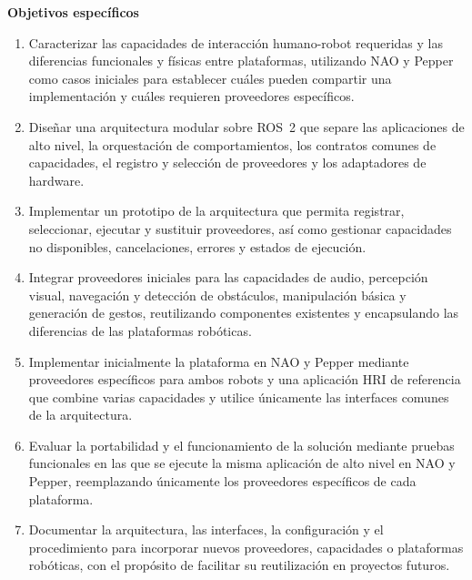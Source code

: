 \documentclass[11pt,letterpaper]{article}
\begin{document}
\par\medskip\noindent\textbf{Objetivos específicos}\par

\begin{enumerate}

\item Caracterizar las capacidades de interacción humano-robot requeridas y las diferencias funcionales y físicas entre plataformas, utilizando NAO y Pepper como casos iniciales para establecer cuáles pueden compartir una implementación y cuáles requieren proveedores específicos.

\item Diseñar una arquitectura modular sobre ROS~2 que separe las aplicaciones de alto nivel, la orquestación de comportamientos, los contratos comunes de capacidades, el registro y selección de proveedores y los adaptadores de hardware.

\item Implementar un prototipo de la arquitectura que permita registrar, seleccionar, ejecutar y sustituir proveedores, así como gestionar capacidades no disponibles, cancelaciones, errores y estados de ejecución.

\item Integrar proveedores iniciales para las capacidades de audio, percepción visual, navegación y detección de obstáculos, manipulación básica y generación de gestos, reutilizando componentes existentes y encapsulando las diferencias de las plataformas robóticas.

\item Implementar inicialmente la plataforma en NAO y Pepper mediante proveedores específicos para ambos robots y una aplicación HRI de referencia que combine varias capacidades y utilice únicamente las interfaces comunes de la arquitectura.

\item Evaluar la portabilidad y el funcionamiento de la solución mediante pruebas funcionales en las que se ejecute la misma aplicación de alto nivel en NAO y Pepper, reemplazando únicamente los proveedores específicos de cada plataforma.

\item Documentar la arquitectura, las interfaces, la configuración y el procedimiento para incorporar nuevos proveedores, capacidades o plataformas robóticas, con el propósito de facilitar su reutilización en proyectos futuros.

\end{enumerate}
\end{document}
